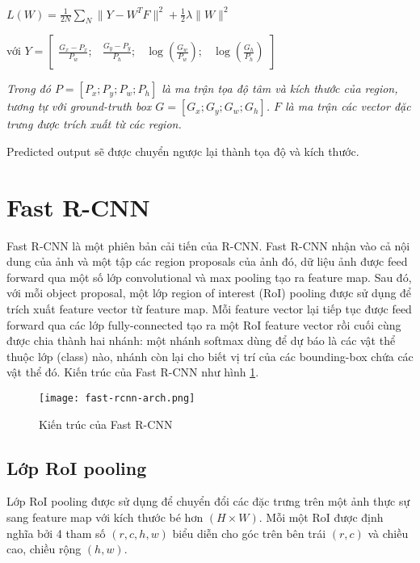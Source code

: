 \documentclass[../thesis.tex]{subfiles}
\begin{document}
$L(W) = \displaystyle\frac{1}{2N}\displaystyle\sum_{N}^{}\|Y - W^TF\|^2 + \frac{1}{2}\lambda\|W\|^2$

với $Y = 
\begin{bmatrix}
	\displaystyle\frac{G_x - P_x}{P_w}; & \displaystyle\frac{G_y - P_y}{P_h}; & \log\left(\displaystyle\frac{G_w}{P_w}\right); & \log\left(\displaystyle\frac{G_h}{P_h}\right)
\end{bmatrix}
$

\textit{Trong đó $P = \left[P_x; P_y; P_w; P_h\right]$ là ma trận tọa độ tâm và kích thước của region, tương tự với ground-truth box $G = \left[G_x; G_y; G_w; G_h\right]$. $F$ là ma trận các vector đặc trưng được trích xuất từ các region.}

Predicted output sẽ được chuyển ngược lại thành tọa độ và kích thước. 

\section{Fast R-CNN}

Fast R-CNN là một phiên bản cải tiến của R-CNN. Fast R-CNN nhận vào cả nội dung của ảnh và một tập các region proposals của ảnh đó, dữ liệu ảnh được feed forward qua một số lớp convolutional và max pooling tạo ra feature map. Sau đó, với mỗi object proposal, một lớp region of interest (RoI) pooling được sử dụng để trích xuất feature vector từ feature map. Mỗi feature vector lại tiếp tục được feed forward qua các lớp fully-connected tạo ra một RoI feature vector rồi cuối cùng được chia thành hai nhánh: một nhánh softmax dùng để dự báo là các vật thể thuộc lớp (class) nào, nhánh còn lại cho biết vị trí của các bounding-box chứa các vật thể đó. Kiến trúc của Fast R-CNN như hình \ref{Fig:fastrcnn}.

\begin{figure}[H]
	\centering
	\texttt{[image: fast-rcnn-arch.png]}
	\caption{Kiến trúc của Fast R-CNN}\label{Fig:fastrcnn}
\end{figure}

\subsection{Lớp RoI pooling}

Lớp RoI pooling được sử dụng để chuyển đổi các đặc trưng trên một ảnh thực sự sang feature map với kích thước bé hơn $(H \times W)$. Mỗi một RoI được định nghĩa bởi 4 tham số $(r, c, h, w)$ biểu diễn cho góc trên bên trái $(r, c)$ và chiều cao, chiều rộng $(h, w)$.
\end{document}
